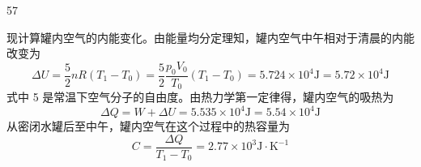 \begin{solution}{57}
\begin{subsolution}
        现计算罐内空气的内能变化。由能量均分定理知，罐内空气中午相对于清晨的内能改变为
        \begin{equation}
            \Delta U = \frac {5}{2} n R (T _ {1} - T _ {0}) = \frac {5}{2} \frac {p _ {0} V _ {0}}{T _ {0}} (T _ {1} - T _ {0}) = 5.724 \times 10^{4} \mathrm{J} = 5.72 \times 10^{4} \mathrm{J}
            \label{eq:26.s57}
        \end{equation}
        式中 5 是常温下空气分子的自由度。由热力学第一定律得，罐内空气的吸热为
        \begin{equation}
            \Delta Q = W + \Delta U = 5.535 \times 10^{4} \mathrm{J} = 5.54 \times 10^{4} \mathrm{J}
            \label{eq:27.s57}
        \end{equation}
        从密闭水罐后至中午，罐内空气在这个过程中的热容量为
        \begin{equation}
            C = \frac {\Delta Q}{T _ {1} - T _ {0}} = 2.77 \times 10^{3} \mathrm{J} \cdot \mathrm{K}^{-1}
            \label{eq:28.s57}
        \end{equation}
    \end{subsolution}
\end{solution}